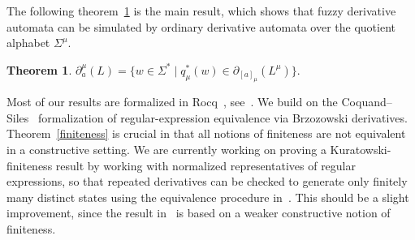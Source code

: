 \documentclass{easychair}
\newtheorem{theorem}{Theorem}
\begin{document}
The following theorem~\ref{main} is the main result, which shows that fuzzy derivative automata can be simulated by ordinary derivative
automata over the quotient alphabet $\Sigma^\mu$. 


\begin{theorem}\label{main}
$
\partial_a^\mu(L)
=
\{w\in\Sigma^\ast\mid
q_\mu^\ast(w)\in
\partial_{[a]_\mu}(L^\mu)\}.
$
\end{theorem}


Most of our results are formalized in Rocq~\cite{Rocq}, see~\cite{OurRocqRepo}. We build on the Coquand--Siles~\cite{CoquandRegexEquality,RocqRegexpBrzozowski} formalization of
regular-expression equivalence via Brzozowski derivatives. Theorem~\ref{finiteness} is crucial in that all notions of finiteness are not equivalent in a constructive setting. We are currently working on proving a Kuratowski-finiteness result by working with normalized representatives of regular
expressions, so that repeated derivatives can be checked to generate only finitely many distinct
states using the equivalence procedure in~\cite{CoquandRegexEquality}. This should be a slight improvement, since the result in~\cite{CoquandRegexEquality} is based on a weaker constructive notion of finiteness.





\end{document}
